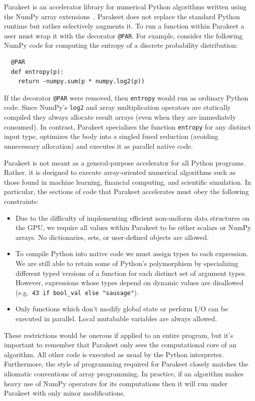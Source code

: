 \documentclass[10pt,twocolumn]{article}
\begin{document}
Parakeet is an accelerator library for numerical Python algorithms written using the NumPy array extensions~\cite{Oliphant07}. Parakeet does not replace the standard Python runtime but rather selectively augments it. To run a function within Parakeet a user must wrap it with the decorator \lstinline{@PAR}. For example, consider the following NumPy code for computing the entropy of a discrete probability distribution: 
\begin{lstlisting}
  @PAR
  def entropy(p):
    return -numpy.sum(p * numpy.log2(p))
\end{lstlisting}
If the decorator \lstinline{@PAR} were removed, then \lstinline{entropy} would run as ordinary Python code. Since NumPy's \lstinline{log2} and array multiplication operators are statically compiled they always allocate result arrays (even when they are immediately consumed). In contrast, Parakeet specializes the function \lstinline{entropy} for any distinct input type, optimizes the body into a singled fused reduction (avoiding unnecessary allocation) and executes it as parallel native code.

Parakeet is not meant as a general-purpose accelerator for all Python programs.  Rather, it is designed to execute array-oriented numerical algorithms such as those found in machine learning, financial computing, and scientific simulation. In particular, the sections of code that Parakeet accelerates must obey the following constraints:

\begin{itemize}
 \item Due to the difficulty of implementing efficient non-uniform data structures on the GPU, we require all values within Parakeet to be either scalars or NumPy arrays. No dictionaries, sets, or user-defined objects are allowed. 
 \item To compile Python into native code we must assign types to each expression. We are still able to retain some of Python's polymorphism by specializing different typed versions of a function for each distinct set of argument types. However, expressions whose types depend on dynamic values are disallowed (e.g.~\lstinline{43 if bool_val else "sausage"}).
 \item Only functions which don't modify global state or perform I/O can be executed in parallel. Local mutabable variables are  always allowed.
\end{itemize}

These restrictions would be onerous if applied to an entire program, but it's important to remember that Parakeet only sees the computational core of an algorithm. All other code is executed as usual by the Python interpreter. Furthermore, the style of programming required for Parakeet closely matches the idiomatic conventions of array programming. In practice, if an algorithm makes heavy use of NumPy operators for its computations then it will run under Parakeet with only minor modifications. 
\end{document}
